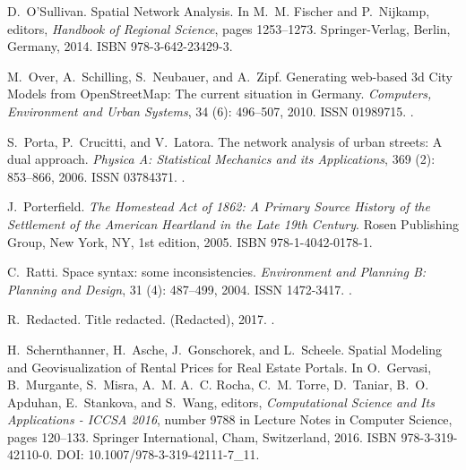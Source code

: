 \documentclass[Afour,sageh,times]{sagej}
\begin{document}
\begin{thebibliography}{54}
	D.~O'Sullivan.
	\newblock Spatial {Network} {Analysis}.
	\newblock In M.~M. Fischer and P.~Nijkamp, editors, \emph{Handbook of
		{Regional} {Science}}, pages 1253--1273. Springer-Verlag, Berlin, Germany,
	2014.
	\newblock ISBN 978-3-642-23429-3.
	
	M.~Over, A.~Schilling, S.~Neubauer, and A.~Zipf.
	\newblock Generating web-based 3d {City} {Models} from {OpenStreetMap}: {The}
	current situation in {Germany}.
	\newblock \emph{Computers, Environment and Urban Systems}, 34
	(6): 496--507, 2010.
	\newblock ISSN 01989715.
	\newblock {}.
	
	S.~Porta, P.~Crucitti, and V.~Latora.
	\newblock The network analysis of urban streets: {A} dual approach.
	\newblock \emph{Physica A: Statistical Mechanics and its Applications},
	369 (2): 853--866, 2006.
	\newblock ISSN 03784371.
	\newblock {}.
	
	J.~Porterfield.
	\newblock \emph{The {Homestead} {Act} of 1862: {A} {Primary} {Source} {History}
		of the {Settlement} of the {American} {Heartland} in the {Late} 19th
		{Century}}.
	\newblock Rosen Publishing Group, New York, NY, 1st edition, 2005.
	\newblock ISBN 978-1-4042-0178-1.
	
	C.~Ratti.
	\newblock Space syntax: some inconsistencies.
	\newblock \emph{Environment and Planning B: Planning and Design}, 31
	(4): 487--499, 2004.
	\newblock ISSN 1472-3417.
	\newblock {}.
	
	R.~Redacted.
	\newblock Title redacted.
	\newblock {} (Redacted), 2017.
	\newblock {}.
	
	H.~Schernthanner, H.~Asche, J.~Gonschorek, and L.~Scheele.
	\newblock Spatial {Modeling} and {Geovisualization} of {Rental} {Prices} for
	{Real} {Estate} {Portals}.
	\newblock In O.~Gervasi, B.~Murgante, S.~Misra, A.~M. A.~C. Rocha, C.~M. Torre,
	D.~Taniar, B.~O. Apduhan, E.~Stankova, and S.~Wang, editors,
	\emph{Computational {Science} and {Its} {Applications} - {ICCSA} 2016},
	number 9788 in Lecture {Notes} in {Computer} {Science}, pages 120--133.
	Springer International, Cham, Switzerland, 2016.
	\newblock ISBN 978-3-319-42110-0.
	\newblock DOI: 10.1007/978-3-319-42111-7\_11.
	

\end{thebibliography}
\end{document}
